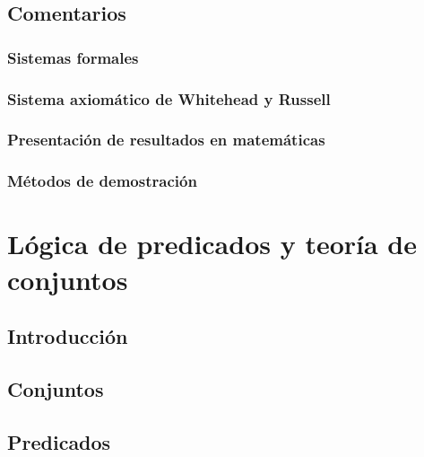 \documentclass[10pt]{book}
\begin{document}
  \section{Comentarios}

    \subsection{Sistemas formales}
    

    \subsection{Sistema axiomático de Whitehead y Russell}
    

    \subsection{Presentación de resultados en matemáticas}
    

    \subsection{Métodos de demostración}
    








\chapter{Lógica de predicados y teoría de conjuntos}%
\label{ch:conjuntos}


  \section{Introducción}
  


  \section{Conjuntos}
  


  \section{Predicados}
  
\end{document}

